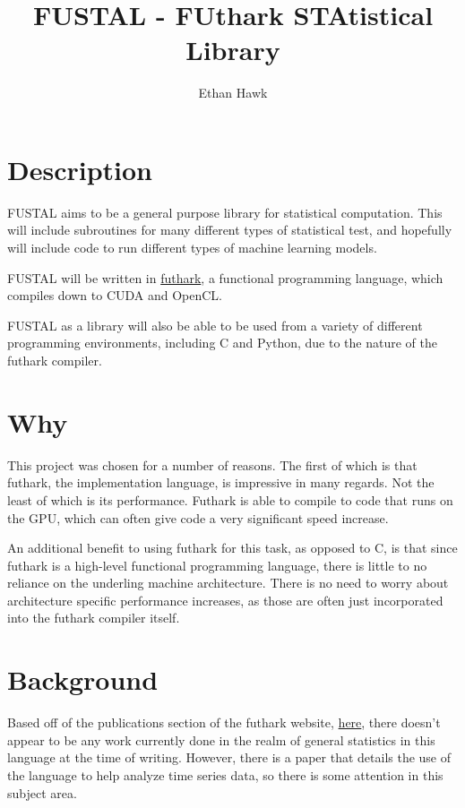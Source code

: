 \documentclass{article}
\author{Ethan Hawk}
\title{FUSTAL - \textbf{FU}thark \textbf{STA}tistical \textbf{L}ibrary}
\begin{document}
\maketitle
\tableofcontents

\newpage
\section{Description}

FUSTAL aims to be a general purpose library for statistical computation.
This will include subroutines for many different types of statistical test,
and hopefully will include code to run different types of machine learning
models.

FUSTAL will be written in \href{https://futhark-lang.org/}{futhark}, a
functional programming language, which compiles down to CUDA and OpenCL.

FUSTAL as a library will also be able to be used from a variety of different
programming environments, including C and Python, due to the nature of the
futhark compiler.

\section{Why}

This project was chosen for a number of reasons. The first of which is that
futhark, the implementation language, is impressive in many regards. Not the
least of which is its performance. Futhark is able to compile to code that runs
on the GPU, which can often give code a very significant speed increase.

An additional benefit to using futhark for this task, as opposed to C, is that 
since futhark is a high-level functional programming language, there is little
to no reliance on the underling machine architecture. There is no need to worry
about architecture specific performance increases, as those are often just
incorporated into the futhark compiler itself.

\section{Background}

Based off of the publications section of the futhark website,
\href{https://futhark-lang.org/publications.html}{here}, there doesn't
appear to be any work currently done in the realm of general statistics in
this language at the time of writing. However, there is a paper that details
the use of the language to help analyze time series data, so there is some
attention in this subject area.
\end{document}
